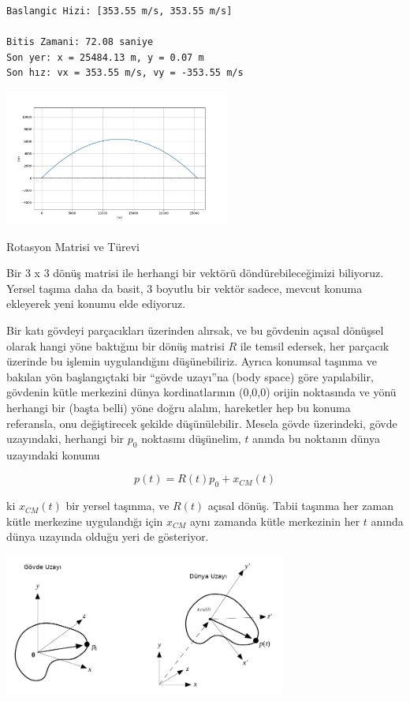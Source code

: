 \documentclass[12pt,fleqn]{article}\usepackage{../../common}
\begin{document}
\begin{verbatim}
Baslangic Hizi: [353.55 m/s, 353.55 m/s]

Bitis Zamani: 72.08 saniye
Son yer: x = 25484.13 m, y = 0.07 m
Son hız: vx = 353.55 m/s, vy = -353.55 m/s
\end{verbatim}

\includegraphics[width=20em]{phy_005_basics_05_05.jpg}


Rotasyon Matrisi ve Türevi

Bir 3 x 3 dönüş matrisi ile herhangi bir vektörü döndürebileceğimizi biliyoruz.
Yersel taşıma daha da basit, 3 boyutlu bir vektör sadece, mevcut konuma
ekleyerek yeni konumu elde ediyoruz.

Bir katı gövdeyi parçacıkları üzerinden alırsak, ve bu gövdenin açısal dönüşsel
olarak hangi yöne baktığını bir dönüş matrisi $R$ ile temsil edersek, her
parçacık üzerinde bu işlemin uygulandığını düşünebiliriz. Ayrıca konumsal
taşınma ve bakılan yön başlangıçtaki bir ``gövde uzayı''na (body space) göre
yapılabilir, gövdenin kütle merkezini dünya kordinatlarının (0,0,0) orijin
noktasında ve yönü herhangi bir (başta belli) yöne doğru alalım, hareketler hep
bu konuma referansla, onu değiştirecek şekilde düşünülebilir.  Mesela gövde
üzerindeki, gövde uzayındaki, herhangi bir $p_0$ noktasını düşünelim, $t$ anında
bu noktanın dünya uzayındaki konumu

$$
p(t) = R(t) p_0 + x_{CM}(t)
$$

ki $x_{CM}(t)$ bir yersel taşınma, ve $R(t)$ açısal dönüş. Tabii taşınma her
zaman kütle merkezine uygulandığı için $x_{CM}$ aynı zamanda kütle merkezinin
her $t$ anında dünya uzayında olduğu yeri de gösteriyor.

\includegraphics[width=25em]{phy_005_basics_04_04.png}
\end{document}
